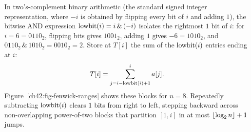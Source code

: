 \begin{intuitionbox}
In two's-complement binary arithmetic (the standard signed integer representation, where $-i$ is obtained by flipping every bit of $i$ and adding $1$), the bitwise AND expression $\operatorname{lowbit}(i) = i \,\&\, (-i)$ isolates the rightmost $1$ bit of $i$: for $i = 6 = 0110_2$, flipping bits gives $1001_2$, adding $1$ gives $-6 = 1010_2$, and $0110_2 \,\&\, 1010_2 = 0010_2 = 2$. Store at $T[i]$ the sum of the $\operatorname{lowbit}(i)$ entries ending at $i$:
\[
  T[i] = \sum_{j = i - \operatorname{lowbit}(i) + 1}^{i} a[j].
\]
Figure~\ref{ch42:fig-fenwick-ranges} shows these blocks for $n=8$. Repeatedly subtracting $\operatorname{lowbit}(i)$ clears $1$ bits from right to left, stepping backward across non-overlapping power-of-two blocks that partition $[1, i]$ in at most $\lfloor\log_2 n\rfloor + 1$ jumps.
\end{intuitionbox}

